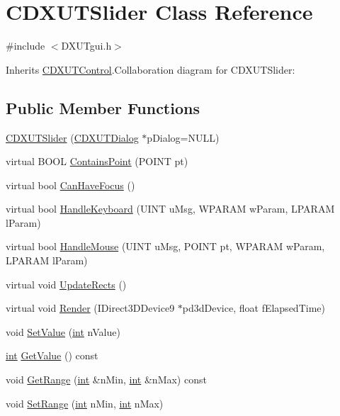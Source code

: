 \hypertarget{class_c_d_x_u_t_slider}{
\section{CDXUTSlider Class Reference}
\label{class_c_d_x_u_t_slider}
}


{\ttfamily \#include $<$DXUTgui.h$>$}

Inherits \hyperlink{class_c_d_x_u_t_control}{CDXUTControl}.Collaboration diagram for CDXUTSlider:\subsection*{Public Member Functions}
\begin{DoxyCompactItemize}
\item 
\hyperlink{class_c_d_x_u_t_slider_ae7a6fff7f9d0e05058b980e952e4bd7b}{CDXUTSlider} (\hyperlink{class_c_d_x_u_t_dialog}{CDXUTDialog} $\ast$pDialog=NULL)
\item 
virtual BOOL \hyperlink{class_c_d_x_u_t_slider_a8c3b16c9ae0c7aa68797f58aced30d16}{ContainsPoint} (POINT pt)
\item 
virtual bool \hyperlink{class_c_d_x_u_t_slider_afbda40a898fbc1424759bc530899475d}{CanHaveFocus} ()
\item 
virtual bool \hyperlink{class_c_d_x_u_t_slider_a964f84282a049232a0620eaa58242fd2}{HandleKeyboard} (UINT uMsg, WPARAM wParam, LPARAM lParam)
\item 
virtual bool \hyperlink{class_c_d_x_u_t_slider_a20c8e1a621cc1a18f0535f5fd4bbd273}{HandleMouse} (UINT uMsg, POINT pt, WPARAM wParam, LPARAM lParam)
\item 
virtual void \hyperlink{class_c_d_x_u_t_slider_a091410aa578fc041b84e4173a969df58}{UpdateRects} ()
\item 
virtual void \hyperlink{class_c_d_x_u_t_slider_aaddc1a6d901a7601792f2f40cbcce501}{Render} (IDirect3DDevice9 $\ast$pd3dDevice, float fElapsedTime)
\item 
void \hyperlink{class_c_d_x_u_t_slider_a0f3442fdf18473cd6c7dd6f8d065ee9e}{SetValue} (\hyperlink{_d_x_u_tgui_8cpp_a2d77ed03302b6978834ee3b6f57837fb}{int} nValue)
\item 
\hyperlink{_d_x_u_tgui_8cpp_a2d77ed03302b6978834ee3b6f57837fb}{int} \hyperlink{class_c_d_x_u_t_slider_a74bf427b42c992666beddd456fe812e6}{GetValue} () const 
\item 
void \hyperlink{class_c_d_x_u_t_slider_a84b28fcfeb72033f7ad4df3b505e62e5}{GetRange} (\hyperlink{_d_x_u_tgui_8cpp_a2d77ed03302b6978834ee3b6f57837fb}{int} \&nMin, \hyperlink{_d_x_u_tgui_8cpp_a2d77ed03302b6978834ee3b6f57837fb}{int} \&nMax) const 
\item 
void \hyperlink{class_c_d_x_u_t_slider_a9401e45afcdd5c8f74e6120402ec068d}{SetRange} (\hyperlink{_d_x_u_tgui_8cpp_a2d77ed03302b6978834ee3b6f57837fb}{int} nMin, \hyperlink{_d_x_u_tgui_8cpp_a2d77ed03302b6978834ee3b6f57837fb}{int} nMax)
\end{DoxyCompactItemize}
